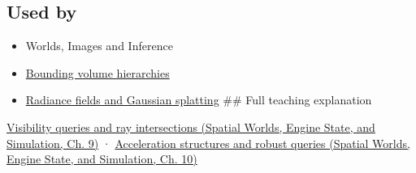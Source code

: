 \subsection{Used by}\label{appendix-47ac1bd6d144-used-by}

\hypertarget{appendix-47ac1bd6d144-used-by}{}

\begin{itemize}
\item
  {Worlds, Images and Inference}
\item
  \hyperref[appendix-0b426c47dd78]{Bounding volume hierarchies}
\item
  \hyperref[appendix-c5b332e400e7]{Radiance fields and Gaussian splatting} \#\# Full teaching explanation
\end{itemize}

\href{../05-Spatial-Worlds-Engine-State-and-Simulation/main.pdf\#nameddest=04-visual-computing-ii-ch028-visibility-queries-and-ray-intersections-1}{Visibility queries and ray intersections (Spatial Worlds, Engine State, and Simulation, Ch. 9)} · \href{../05-Spatial-Worlds-Engine-State-and-Simulation/main.pdf\#nameddest=04-visual-computing-ii-ch029-acceleration-structures-and-robust-queries-1}{Acceleration structures and robust queries (Spatial Worlds, Engine State, and Simulation, Ch. 10)}

